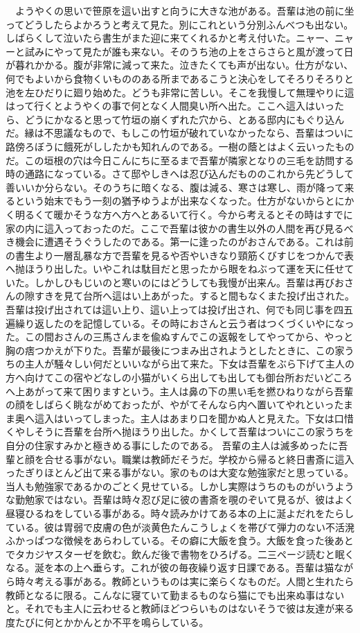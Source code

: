 \documentclass[12pt,a4paper,onecolumn]{jsreport}
\begin{document}
　ようやくの思いで笹原を這い出すと向うに大きな池がある。吾輩は池の前に坐ってどうしたらよかろうと考えて見た。別にこれという分別ふんべつも出ない。しばらくして泣いたら書生がまた迎に来てくれるかと考え付いた。ニャー、ニャーと試みにやって見たが誰も来ない。そのうち池の上をさらさらと風が渡って日が暮れかかる。腹が非常に減って来た。泣きたくても声が出ない。仕方がない、何でもよいから食物くいもののある所まであるこうと決心をしてそろりそろりと池を左ひだりに廻り始めた。どうも非常に苦しい。そこを我慢して無理やりに這はって行くとようやくの事で何となく人間臭い所へ出た。ここへ這入はいったら、どうにかなると思って竹垣の崩くずれた穴から、とある邸内にもぐり込んだ。縁は不思議なもので、もしこの竹垣が破れていなかったなら、吾輩はついに路傍ろぼうに餓死がししたかも知れんのである。一樹の蔭とはよく云いったものだ。この垣根の穴は今日こんにちに至るまで吾輩が隣家となりの三毛を訪問する時の通路になっている。さて邸やしきへは忍び込んだもののこれから先どうして善いいか分らない。そのうちに暗くなる、腹は減る、寒さは寒し、雨が降って来るという始末でもう一刻の猶予ゆうよが出来なくなった。仕方がないからとにかく明るくて暖かそうな方へ方へとあるいて行く。今から考えるとその時はすでに家の内に這入っておったのだ。ここで吾輩は彼かの書生以外の人間を再び見るべき機会に遭遇そうぐうしたのである。第一に逢ったのがおさんである。これは前の書生より一層乱暴な方で吾輩を見るや否やいきなり頸筋くびすじをつかんで表へ抛ほうり出した。いやこれは駄目だと思ったから眼をねぶって運を天に任せていた。しかしひもじいのと寒いのにはどうしても我慢が出来ん。吾輩は再びおさんの隙すきを見て台所へ這はい上あがった。すると間もなくまた投げ出された。吾輩は投げ出されては這い上り、這い上っては投げ出され、何でも同じ事を四五遍繰り返したのを記憶している。その時におさんと云う者はつくづくいやになった。この間おさんの三馬さんまを偸ぬすんでこの返報をしてやってから、やっと胸の痞つかえが下りた。吾輩が最後につまみ出されようとしたときに、この家うちの主人が騒々しい何だといいながら出て来た。下女は吾輩をぶら下げて主人の方へ向けてこの宿やどなしの小猫がいくら出しても出しても御台所おだいどころへ上あがって来て困りますという。主人は鼻の下の黒い毛を撚ひねりながら吾輩の顔をしばらく眺ながめておったが、やがてそんなら内へ置いてやれといったまま奥へ這入はいってしまった。主人はあまり口を聞かぬ人と見えた。下女は口惜くやしそうに吾輩を台所へ抛ほうり出した。かくして吾輩はついにこの家うちを自分の住家すみかと極きめる事にしたのである。
吾輩の主人は滅多めったに吾輩と顔を合せる事がない。職業は教師だそうだ。学校から帰ると終日書斎に這入ったぎりほとんど出て来る事がない。家のものは大変な勉強家だと思っている。当人も勉強家であるかのごとく見せている。しかし実際はうちのものがいうような勤勉家ではない。吾輩は時々忍び足に彼の書斎を覗のぞいて見るが、彼はよく昼寝ひるねをしている事がある。時々読みかけてある本の上に涎よだれをたらしている。彼は胃弱で皮膚の色が淡黄色たんこうしょくを帯びて弾力のない不活溌ふかっぱつな徴候をあらわしている。その癖に大飯を食う。大飯を食った後あとでタカジヤスターゼを飲む。飲んだ後で書物をひろげる。二三ページ読むと眠くなる。涎を本の上へ垂らす。これが彼の毎夜繰り返す日課である。吾輩は猫ながら時々考える事がある。教師というものは実に楽らくなものだ。人間と生れたら教師となるに限る。こんなに寝ていて勤まるものなら猫にでも出来ぬ事はないと。それでも主人に云わせると教師ほどつらいものはないそうで彼は友達が来る度たびに何とかかんとか不平を鳴らしている。
\clearpage
\end{document}
